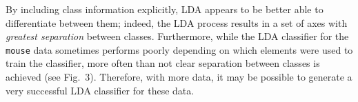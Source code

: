 By including class information explicitly, LDA appears to be better able to differentiate between them; indeed, the LDA process results in a set of axes with \emph{greatest separation} between classes.  Furthermore, while the LDA classifier for the \texttt{mouse} data sometimes performs poorly depending on which elements were used to train the classifier, more often than not clear separation between classes is achieved (see Fig.\ 3).  Therefore, with more data, it may be possible to generate a very successful LDA classifier for these data.






